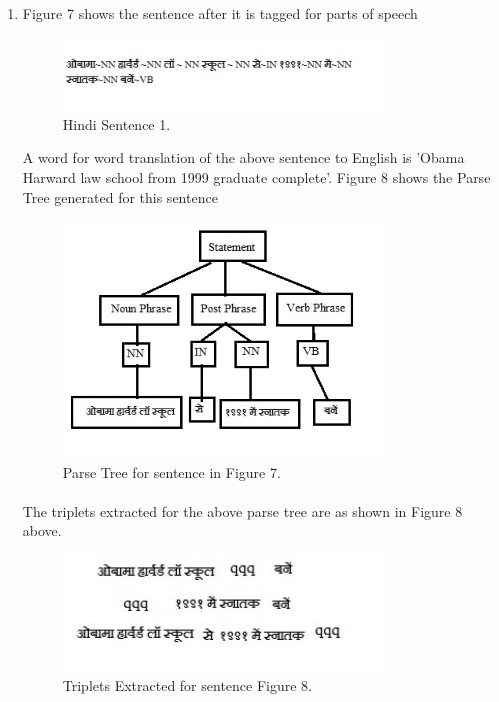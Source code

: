 \begin{enumerate}
\item  Figure 7 shows the sentence after it is tagged for parts of speech

\begin{figure}[htb]
\centering
\includegraphics[width=0.8\textwidth]{images/sentence_testcase1.jpg}
\caption{Hindi Sentence 1.} 
\label{fig:sentence_testcase1}
\end{figure}

A word for word translation of the above sentence to English is 'Obama Harward law school from 1999 graduate complete'. Figure 8 shows the Parse Tree generated for this sentence 

\begin{figure}[htb]
\centering
\includegraphics[width=0.8\textwidth]{images/standalone_testcase.jpg}
\caption{Parse Tree for sentence in Figure 7.} 
\label{fig:standalone_testcase}
\end{figure}

\paragraph{}
The triplets extracted for the above parse tree are as shown in Figure 8 above.

\begin{figure}[htb]
\centering
\includegraphics[width=0.8\textwidth]{images/triplet_standalone.jpg}
\caption{Triplets Extracted for sentence Figure 8.} 
\label{fig:triplet_standalone}
\end{figure}


\end{enumerate}
